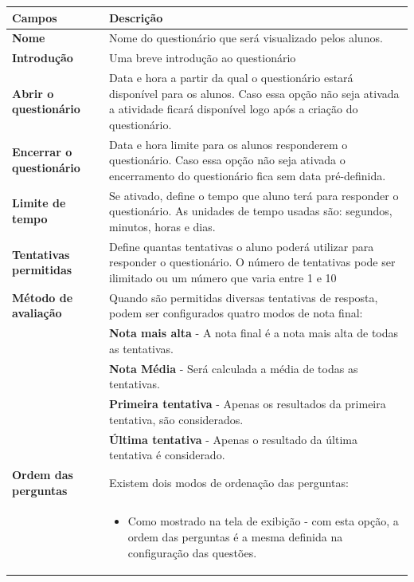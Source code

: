 \begin{longtable}{p{6cm}|p{9cm}}
     \hline
     \rowcolor[rgb]{0.8,0.8,0.8} \textbf{Campos} &  \textbf{Descrição}\\\hline
    \textbf{Nome}                                                      & Nome do questionário que será visualizado pelos alunos.\\\hline
    \textbf{Introdução}                                                & Uma breve introdução ao questionário\\\hline
    \textbf{Abrir o questionário}                                      &Data e hora a partir da qual o questionário estará disponível para os alunos. Caso essa opção não seja ativada a atividade ficará disponível logo após a criação do questionário.\\\hline
    \textbf{Encerrar o questionário} & Data e hora limite para os alunos responderem o questionário. Caso essa opção não seja ativada o encerramento do questionário fica sem data pré-definida. \\\hline
    \textbf{Limite de tempo}                                           &Se ativado, define o tempo que aluno terá para responder o questionário. As unidades de tempo usadas são: segundos, minutos, horas e dias.\\\hline
    \textbf{Tentativas permitidas}                                     &Define quantas tentativas o aluno poderá utilizar para responder o questionário. O número de tentativas pode ser ilimitado ou um número que varia entre 1 e 10\\\hline
    \textbf{Método de avaliação}                                       &Quando são permitidas diversas tentativas de resposta, podem ser configurados quatro modos de nota final:\\
& \textbf{Nota mais alta} - A nota final é a nota mais alta de todas as tentativas.\\
& \textbf{Nota Média} - Será calculada a média de todas as tentativas.\\
& \textbf{Primeira tentativa} - Apenas os resultados da primeira tentativa, são considerados.\\
& \textbf{Última tentativa} - Apenas o resultado da última tentativa é considerado.\\\hline
\textbf{Ordem das perguntas}                                       &Existem dois modos de ordenação das perguntas:\\
&\begin{itemize}
 \item Como mostrado na tela de exibição - com esta opção, a ordem das perguntas é a mesma definida na configuração das questões.

\end{itemize}
\end{longtable}
